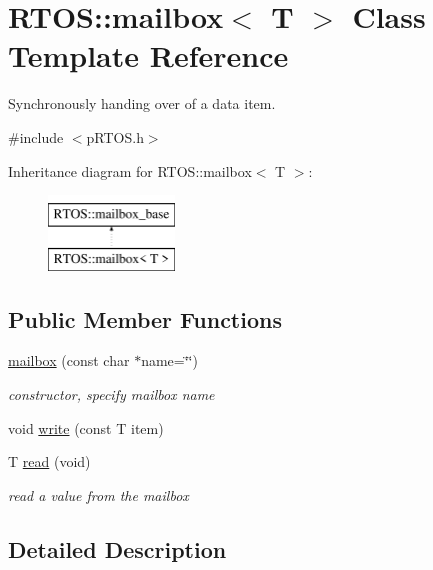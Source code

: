\hypertarget{class_r_t_o_s_1_1mailbox}{}\section{R\+T\+OS\+:\+:mailbox$<$ T $>$ Class Template Reference}
\label{class_r_t_o_s_1_1mailbox}


Synchronously handing over of a data item.  




{\ttfamily \#include $<$p\+R\+T\+O\+S.\+h$>$}

Inheritance diagram for R\+T\+OS\+:\+:mailbox$<$ T $>$\+:\begin{figure}[H]
\begin{center}
\leavevmode
\includegraphics[height=2.000000cm]{class_r_t_o_s_1_1mailbox}
\end{center}
\end{figure}
\subsection*{Public Member Functions}
\begin{DoxyCompactItemize}
\item 
\hyperlink{class_r_t_o_s_1_1mailbox_aaee470ef9fc6627e848e45ca353415ff}{mailbox} (const char $\ast$name=\char`\"{}\char`\"{})
\begin{DoxyCompactList}\small\item\em constructor, specify mailbox name \end{DoxyCompactList}\item 
void \hyperlink{class_r_t_o_s_1_1mailbox_ad140965320e8b42ca16a5d288858f70d}{write} (const T item)
\item 
T \hyperlink{class_r_t_o_s_1_1mailbox_af2bc862b64929b5ec34afa4dec0ed720}{read} (void)
\begin{DoxyCompactList}\small\item\em read a value from the mailbox \end{DoxyCompactList}\end{DoxyCompactItemize}


\subsection{Detailed Description}
